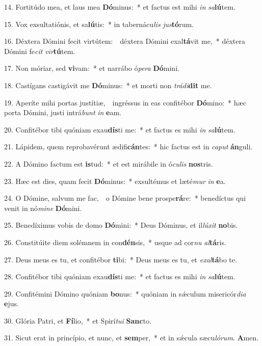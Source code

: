 14. Fortitúdo mea, et laus mea \textbf{Dó}minus:~* et factus est mihi \textit{in} \textit{sa}\textbf{lú}tem.

15. Vox exsultatiónis, et sa\textbf{lú}tis:~* in tabernácu\textit{lis} \textit{jus}\textbf{tó}rum.

16. Déxtera Dómini fecit virtútem:~\GreDagger\ déxtera Dómini exal\textbf{tá}vit me,~* déxtera Dómini fe\textit{cit} \textit{vir}\textbf{tú}tem.

17. Non móriar, sed \textbf{vi}vam:~* et narrábo ó\textit{pe}\textit{ra} \textbf{Dó}mini.

18. Castígans castigávit me \textbf{Dó}minus:~* et morti non \textit{trá}\textit{di}\textbf{dit} me.

19. Aperíte mihi portas justítiæ,~\GreDagger\ ingréssus in eas confitébor \textbf{Dó}mino:~* hæc porta Dómini, justi intrá\textit{bunt} \textit{in} \textbf{e}am.

20. Confitébor tibi quóniam exau\textbf{dís}ti me:~* et factus es mihi \textit{in} \textit{sa}\textbf{lú}tem.

21. Lápidem, quem reprobavérunt ædifi\textbf{cán}tes:~* hic factus est in \textit{ca}\textit{put} \textbf{án}guli.

22. A Dómino factum est \textbf{is}tud:~* et est mirábile in ó\textit{cu}\textit{lis} \textbf{nos}tris.

23. Hæc est dies, quam fecit \textbf{Dó}minus:~* exsultémus et læté\textit{mur} \textit{in} \textbf{e}a.

24. O Dómine, salvum me fac,~\GreDagger\ o Dómine bene prospe\textbf{rá}re:~* benedíctus qui venit in nó\textit{mi}\textit{ne} \textbf{Dó}mini.

25. Benedíximus vobis de domo \textbf{Dó}mini:~* Deus Dóminus, et il\textit{lú}\textit{xit} \textbf{no}bis.

26. Constitúite diem solémnem in con\textbf{dén}sis,~* usque ad cor\textit{nu} \textit{al}\textbf{tá}ris.

27. Deus meus es tu, et confitébor \textbf{ti}bi:~* Deus meus es tu, et \textit{ex}\textit{al}\textbf{tá}bo te.

28. Confitébor tibi quóniam exau\textbf{dís}ti me:~* et factus es mihi \textit{in} \textit{sa}\textbf{lú}tem.

29. Confitémini Dómino quóniam \textbf{bo}nus:~* quóniam in s\'{\ae}culum misericór\textit{di}\textit{a} \textbf{e}jus.

30. Glória Patri, et \textbf{Fí}lio,~* et Spirí\textit{tu}\textit{i} \textbf{Sanc}to.

31. Sicut erat in princípio, et nunc, et \textbf{sem}per,~* et in s\'{\ae}cula sæcu\textit{ló}\textit{rum}. \textbf{A}men.
